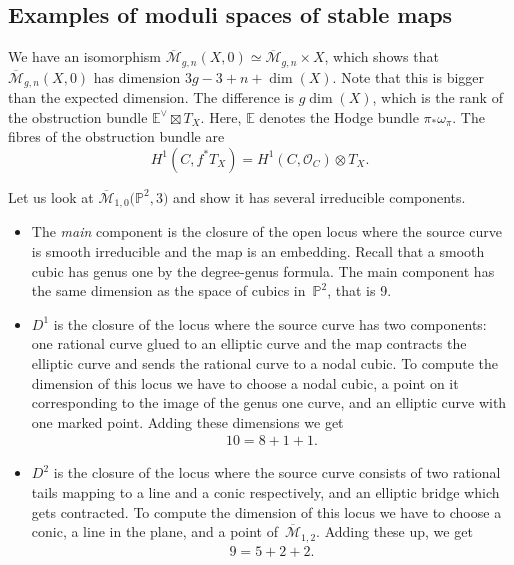 \documentclass[pdftex]{sigma}
\numberwithin{equation}{section}
\newcommand{\OO}{\mathcal{O}}
\newcommand{\MM}[4]{\overline{\mathcal M}_{#1,#2}(#3,#4)}
\theoremstyle{plain}
\theoremstyle{definition}
\theoremstyle{remark}
\begin{document}
\subsection{Examples of moduli spaces of stable maps}
\begin{Example}
 We have an isomorphism $\MM{g}{n}{X}{0}\simeq \overline{\mathcal M}_{g,n}\times X$, which shows that $\MM{g}{n}{X}{0}$ has dimension $3g-3+n+\dim(X)$. Note that this is bigger than the expected dimension. The difference is $g\dim(X)$, which is the rank of the obstruction bundle $\mathbb E^\vee\boxtimes T_X$. Here, $\mathbb E$ denotes the Hodge bundle $\pi_*\omega_\pi$. The fibres of the obstruction bundle are
 \[H^1(C,f^*T_X)=H^1(C,\OO_C)\otimes T_X.
 \]
 \end{Example}
\begin{Example}
Let us look at $\overline{{\mathcal M}}_{1,0}\big({\mathbb P}^2,3\big)$ and show it has several irreducible components.
\begin{itemize}\itemsep=0pt
 \item The \emph{main} component is the closure of the open locus where the source curve is smooth irreducible and the map is an embedding. Recall that a smooth cubic has genus one by the degree-genus formula. The main component has the same dimension as the space of cubics in~$\mathbb P^2$, that is 9.
 \item $D^1$ is the closure of the locus where the source curve has two components: one rational curve glued to an elliptic curve and the map contracts the elliptic curve and sends the rational curve to a nodal cubic. To compute the dimension of this locus we have to choose a nodal cubic, a point on it corresponding to the image of the genus one curve, and an elliptic curve with one marked point. Adding these dimensions we get \begin{gather*}10=8+1+1.\end{gather*}

 \item $D^2$ is the closure of the locus where the source curve consists of two rational tails mapping to a line and a conic respectively, and an elliptic bridge which gets contracted. To compute the dimension of this locus we have to choose a conic, a line in the plane, and a point of~$\overline{\mathcal M}_{1,2}$. Adding these up, we get \begin{gather*}9=5+2+2.\end{gather*}
 \end{itemize}
 \end{Example}
\end{document}
